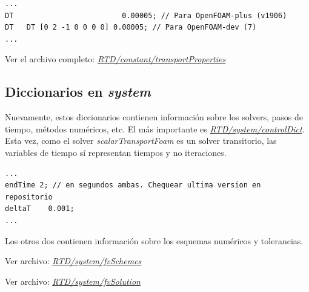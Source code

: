 \documentclass{article}
\begin{document}
\bigskip\bigskip

\begin{lstlisting}
...
DT                         0.00005; // Para OpenFOAM-plus (v1906)
DT   DT [0 2 -1 0 0 0 0] 0.00005; // Para OpenFOAM-dev (7)
...
\end{lstlisting}

Ver el archivo completo: \textit{\href{https://github.com/guillerolle/casos_cfd/blob/master/01/RTD/constant/transportProperties}{RTD/constant/transportProperties}}

%


\subsection{Diccionarios en \textit{system}}
Nuevamente, estos diccionarios contienen información sobre los solvers, pasos de tiempo, métodos numéricos, etc.
El más importante es \textit{\href{https://github.com/guillerolle/casos_cfd/blob/master/01/RTD/system/controlDict}{RTD/system/controlDict}}.  Esta vez, como el solver \textit{scalarTransportFoam} es un solver transitorio, las variables de tiempo sí representan tiempos y no iteraciones.

\begin{lstlisting}
...
endTime 2; // en segundos ambas. Chequear ultima version en repositorio
deltaT 	  0.001;  
...
\end{lstlisting}

Los otros dos contienen información sobre los esquemas numéricos y tolerancias.\par
Ver archivo: \textit{\href{https://github.com/guillerolle/casos_cfd/blob/master/01/RTD/system/fvSchemes}{RTD/system/fvSchemes}}\par
Ver archivo:
\textit{\href{https://github.com/guillerolle/casos_cfd/blob/master/01/RTD/system/fvSolution}{RTD/system/fvSolution}}


%
%
%
\end{document}
